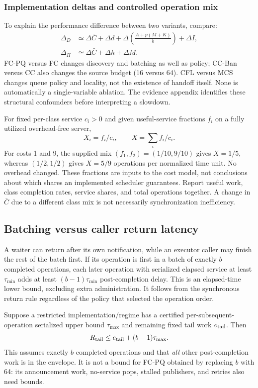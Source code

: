 \subsubsection{Implementation deltas and controlled operation mix}
To explain the performance difference between two variants, compare:
\begin{align}
\Delta_D&\simeq\Delta \bar C+\Delta d+
 \Delta\!\left(\frac{A+p(M+K)}b\right)+\Delta I,\\
\Delta_H&\simeq\Delta\bar C+\Delta h+\Delta M.
\end{align}
FC-PQ versus FC changes discovery and batching as well as policy; CC-Ban
versus CC also changes the source budget (16 versus 64). CFL versus MCS
changes queue policy and locality, not the existence of handoff itself.
None is automatically a single-variable ablation. The evidence appendix
identifies these structural confounders before interpreting a slowdown.

For fixed per-class service $c_i>0$ and given useful-service fractions $f_i$
on a fully utilized overhead-free server,
\begin{equation}
 X_i=f_i/c_i,\qquad X=\sum_i f_i/c_i.\label{eq:mix}
\end{equation}
For costs 1 and 9, the supplied mix $(f_1,f_2)=(1/10,9/10)$ gives
$X=1/5$, whereas $(1/2,1/2)$ gives $X=5/9$ operations per normalized time
unit. No overhead changed. These fractions are inputs to the cost model,
not conclusions about which shares an implemented scheduler guarantees.
Report useful work, class completion rates, service shares, and total
operations together. A change in $\bar C$ due to a different class mix is not
necessarily synchronization inefficiency.

\subsection{Batching versus caller return latency}
\label{sec:return}
A waiter can return after its own notification, while an executor caller may
finish the rest of the batch first. If its operation is first in a batch of
exactly $b$ completed operations, each later operation with serialized elapsed
service at least $\tau_{\min}$ adds at least $(b-1)\tau_{\min}$
post-completion delay. This is an elapsed-time lower bound, excluding extra
administration. It follows from the synchronous return rule regardless of
the policy that selected the operation order.

Suppose a restricted implementation/regime has a certified per-subsequent-
operation serialized upper bound $\tau_{\max}$ and remaining fixed tail work
$e_{\rm tail}$. Then
\begin{equation}
 R_{\rm tail}\le e_{\rm tail}+(b-1)\tau_{\max}.\label{eq:tail}
\end{equation}
This assumes exactly $b$ completed operations and that \emph{all} other
post-completion work is in the envelope. It is not a bound for FC-PQ obtained
by replacing $b$ with 64: its announcement work, no-service pops, stalled
publishers, and retries also need bounds.

